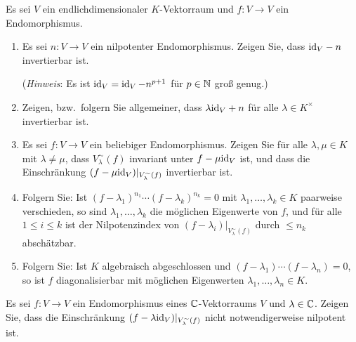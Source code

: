 \begin{question}[subtitle = Zu Haupträumen]{2}
  Es sei $V$ ein endlichdimensionaler $K$-Vektorraum und $f \colon V \to V$ ein Endomorphismus.
  \begin{enumerate}[leftmargin=*]
    \item
      Es sei $n \colon V \to V$ ein nilpotenter Endomorphismus.
      Zeigen Sie, dass ${\operatorname{id}_V} - n$ invertierbar ist.
      
      (\emph{Hinweis}:
       Es ist $\operatorname{id}_V = \operatorname{id}_V - n^{p+1}$ für $p \in \mathbb{N}$ groß genug.)
    \item
      Zeigen, bzw.\ folgern Sie allgemeiner, dass $\lambda {\operatorname{id}_V} + n$ für alle $\lambda \in K^\times$ invertierbar ist.
    \item
      Es sei $f \colon V \to V$ ein beliebiger Endomorphismus.
      Zeigen Sie für alle $\lambda, \mu \in K$ mit $\lambda \neq \mu$, dass $V^\sim_\lambda(f)$ invariant unter $f - \mu {\operatorname{id}_V}$ ist, und dass die Einschränkung $(f - \mu {\operatorname{id}_V})|_{V^\sim_\lambda(f)}$ invertierbar ist.
    \item
      Folgern Sie:
      Ist $(f - \lambda_1)^{n_1} \dotsm (f - \lambda_k)^{n_k} = 0$ mit $\lambda_1, \dotsc, \lambda_k \in K$ paarweise verschieden, so sind $\lambda_1, \dotsc, \lambda_k$ die möglichen Eigenwerte von $f$, und für alle $1 \leq i \leq k$ ist der Nilpotenzindex von $(f - \lambda_i)|_{V^\sim_\lambda(f)}$ durch $\leq n_k$ abschätzbar.
    \item
      Folgern Sie:
      Ist $K$ algebraisch abgeschlossen und $(f - \lambda_1) \dotsm (f - \lambda_n) = 0$, so ist $f$ diagonalisierbar mit möglichen Eigenwerten $\lambda_1, \dotsc, \lambda_n \in K$.
  \end{enumerate}
\end{question}


\begin{question}[subtitle = Ein Gegenbeispiel]{2}
  Es sei $f \colon V \to V$ ein Endomorphismus eines $\mathbb{C}$-Vektorraums $V$ und $\lambda \in \mathbb{C}$.
  Zeigen Sie, dass die Einschränkung $(f - \lambda {\operatorname{id}_V})|_{V^\sim_\lambda(f)}$ nicht notwendigerweise nilpotent ist.
\end{question}


